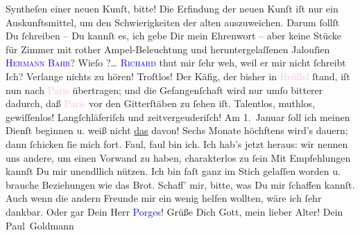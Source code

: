                Syntheſen einer neuen Kunſt, bitte! Die Erfindung der neuen Kunſt iſt nur ein
               Auskunftsmittel, um den Schwierigkeiten der alten auszuweichen. Darum ſollſt Du
               ſchreiben – Du kannſt es, ich gebe Dir mein Ehrenwort – aber keine Stücke für Zimmer
               mit rother Ampel-Beleuchtung und heruntergelaſſenen Jalouſien{\dotsfive}\pend
           \pstart
           \textsc{\textcolor{blue}{Hermann Bahr}{}\ledrightnote{\textcolor{blue}{Hermann Bahr}}}? Wieſo \label{K_L02676-5v}\label{K_L02676-5h}?{\dots}\pend
           \pstart
           \textsc{\textcolor{blue}{Richard}{}\ledrightnote{\textcolor{blue}{Richard Beer-Hofmann}}} thut mir ſehr weh, weil er mir nicht ſchreibt{\dotsfive}\pend
           \pstart
           Ich? Verlange nichts zu hören! Troſtlos! Der Käfig, der bisher in \textcolor{pink}{Brüſſel}{}\ledrightnote{\textcolor{pink}{Brüssel}} ſtand, iſt nun nach \textcolor{pink}{Paris}{}\ledrightnote{\textcolor{pink}{Paris}} übertragen; und die Gefangenſchaft wird nur {\pb}umſo bitterer dadurch, daß \textcolor{pink}{Paris}{}\ledrightnote{\textcolor{pink}{Paris}} vor den Gitterſtäben zu ſehen iſt. Talentlos, muthlos,
               gewiſſenlos! Langſchläferiſch und zeitvergeuderiſch! Am 1. Januar ſoll ich meinen Dienſt beginnen u. weiß nicht \uline{das} davon! Sechs Monate höchftens wird’s dauern; dann
               ſchicken ſie mich fort. Faul, faul bin ich. Ich hab’s jetzt heraus: wir nennen uns
               andere, um einen Vorwand zu haben, charakterlos zu ſein{\dotsfour}\pend
           \pstart
           Mit Empfehlungen kannſt Du mir unendllich nützen. Ich bin faſt ganz im Stich gelaſſen
               worden u. brauche Beziehungen wie das Brot. Schaff’ mir, bitte, was Du mir ſchaffen
               kannſt. Auch wenn die andern Freunde mir ein wenig helfen wollten, wäre ich ſehr
               dankbar. Oder gar Dein Herr \textcolor{blue}{Porges}{}\ledrightnote{\textcolor{blue}{Porges}}! Grüße Dich Gott, mein lieber Alter!\pend
           \pstart Dein \spacefill\mbox{Paul Goldmann}\pend{}\pstart
           \noindent{}\label{T_L02676-1v}\label{T_L02676-1h}\pend
           \endnumbering{}  
      